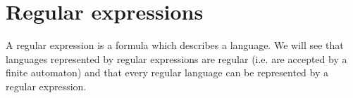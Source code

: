 \section{Regular expressions}
A regular expression is a formula which describes a language.
We will see that languages represented by regular expressions are regular (i.e. are accepted by a finite automaton)
and that every regular language can be represented by a regular expression.
